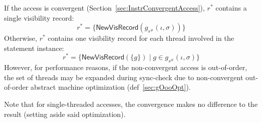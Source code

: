If the access is convergent (Section~\ref{sec:InstrConvergentAccess}), $r^*$ contains a single visibility record:
\begin{equation*}
    r^* = \{ \mathsf{NewVisRecord}(g_{s^\#}(\iota, \sigma)) \}
\end{equation*}
Otherwise, $r^*$ contains one visibility record for each thread involved in the statement instance:
\begin{equation*}
    r^* = \{ \mathsf{NewVisRecord}(\{g\}) \mid g \in g_{s^\#}(\iota, \sigma) \}
\end{equation*}
However, for performance reasons, if the non-convergent access is out-of-order, the set of threads may be expanded during sync-check due to non-convergent out-of-order abstract machine optimization (def~\ref{sec:gOooOpt}).

Note that for single-threaded accesses, the convergence makes no difference to the result (setting aside said optimization).

